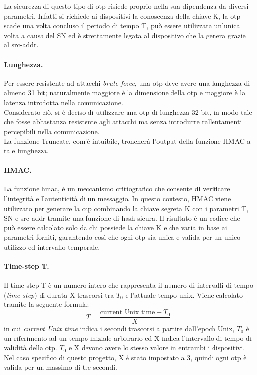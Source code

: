 La sicurezza di questo tipo di \gls{otp} risiede proprio nella sua dipendenza da diversi parametri. Infatti si richiede ai dispositivi la conoscenza della chiave K, la \gls{otp} scade una volta concluso il periodo di tempo T, può essere utilizzata un'unica volta a causa del SN ed è strettamente legata al dispositivo che la genera grazie al src-addr.

\paragraph{Lunghezza.}
Per essere resistente ad attacchi \textit{brute force}, una \gls{otp} deve avere una lunghezza di almeno 31 bit; naturalmente maggiore è la dimensione della \gls{otp} e maggiore è la latenza introdotta nella comunicazione.\\
Considerato ciò, si è deciso di utilizzare una \gls{otp} di lunghezza 32 bit, in modo tale che fosse abbastanza resistente agli attacchi ma senza introdurre rallentamenti percepibili nella comunicazione.\\
La funzione Truncate, com'è intuibile, troncherà l'output della funzione HMAC a tale lunghezza.

\paragraph{HMAC.}
La funzione \gls{hmac}\glsfirstoccur, è un meccanismo crittografico che consente di verificare l'integrità e l'autenticità di un messaggio. In questo contesto, HMAC viene utilizzato per generare la \gls{otp} combinando la chiave segreta K con i parametri T, SN e src-addr tramite una funzione di hash sicura. Il risultato è un codice che può essere calcolato solo da chi possiede la chiave K e che varia in base ai parametri forniti, garantendo così che ogni \gls{otp} sia unica e valida per un unico utilizzo ed intervallo temporale.

\paragraph{Time-step T.}
Il time-step T è un numero intero che rappresenta il numero di intervalli di tempo (\textit{time-step}) di durata X trascorsi tra $T_0$ e l'attuale tempo unix. Viene calcolato tramite la seguente formula:
\begin{equation}
    T = \frac{\text{current Unix time} - T_0}{X}
    \label{eq:timestep}
\end{equation}
in cui \textit{current Unix time} indica i secondi trascorsi a partire dall'epoch Unix, $T_0$ è un riferimento ad un tempo iniziale arbitrario ed X indica l'intervallo di tempo di validità della \gls{otp}. $T_0$ e X devono avere lo stesso valore in entrambi i dispositivi.\\
Nel caso specifico di questo progetto, X è stato impostato a 3, quindi ogni \gls{otp} è valida per un massimo di tre secondi.

